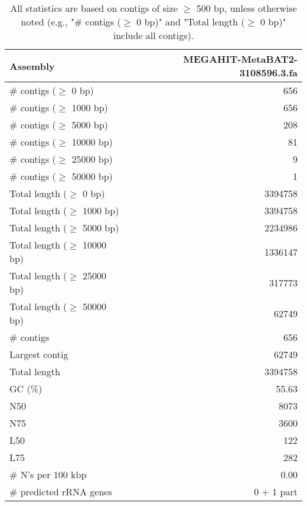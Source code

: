 \documentclass[12pt,a4paper]{article}
\begin{document}
\begin{table}[ht]
\begin{center}
\caption{All statistics are based on contigs of size $\geq$ 500 bp, unless otherwise noted (e.g., "\# contigs ($\geq$ 0 bp)" and "Total length ($\geq$ 0 bp)" include all contigs).}
\begin{tabular}{|l*{1}{|r}|}
\hline
Assembly & MEGAHIT-MetaBAT2-3108596.3.fa \\ \hline
\# contigs ($\geq$ 0 bp) & 656 \\ \hline
\# contigs ($\geq$ 1000 bp) & 656 \\ \hline
\# contigs ($\geq$ 5000 bp) & 208 \\ \hline
\# contigs ($\geq$ 10000 bp) & 81 \\ \hline
\# contigs ($\geq$ 25000 bp) & 9 \\ \hline
\# contigs ($\geq$ 50000 bp) & 1 \\ \hline
Total length ($\geq$ 0 bp) & 3394758 \\ \hline
Total length ($\geq$ 1000 bp) & 3394758 \\ \hline
Total length ($\geq$ 5000 bp) & 2234986 \\ \hline
Total length ($\geq$ 10000 bp) & 1336147 \\ \hline
Total length ($\geq$ 25000 bp) & 317773 \\ \hline
Total length ($\geq$ 50000 bp) & 62749 \\ \hline
\# contigs & 656 \\ \hline
Largest contig & 62749 \\ \hline
Total length & 3394758 \\ \hline
GC (\%) & 55.63 \\ \hline
N50 & 8073 \\ \hline
N75 & 3600 \\ \hline
L50 & 122 \\ \hline
L75 & 282 \\ \hline
\# N's per 100 kbp & 0.00 \\ \hline
\# predicted rRNA genes & 0 + 1 part \\ \hline
\end{tabular}
\end{center}
\end{table}
\end{document}
